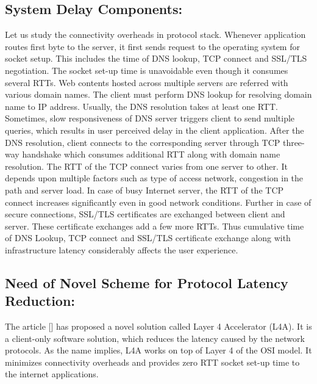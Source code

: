 \begin{multicols}{2}
\subsection{System Delay Components:}

Let us study the connectivity overheads in protocol stack. Whenever application routes first byte to the server, it first sends request to the operating system for socket setup. This includes the time of DNS lookup, TCP connect and SSL/TLS negotiation. The socket set-up time is unavoidable even though it consumes several RTTs. Web contents hosted across multiple servers are referred with various domain names. The client must perform DNS lookup for resolving domain name to IP address. Usually, the DNS resolution takes at least one RTT. Sometimes, slow responsiveness of DNS server triggers client to send multiple queries, which results in user perceived delay in the client application. After the DNS resolution, client connects to the corresponding server through TCP three-way handshake which consumes additional RTT along with domain name resolution. The RTT of the TCP connect varies from one server to other. It depends upon multiple factors such as type of access network, congestion in the path and server load. In case of busy Internet server, the RTT of the TCP connect increases significantly even in good network conditions. Further in case of secure connections, SSL/TLS certificates are exchanged between client and server. These certificate exchanges add a few more RTTs. Thus cumulative time of DNS Lookup, TCP connect and SSL/TLS certificate exchange along with infrastructure latency considerably affects the user experience.


\subsection{Need of Novel Scheme for Protocol Latency Reduction:}

The article [\cite{art1-key13}] has proposed a novel solution called Layer 4 Accelerator (L4A). It is a client-only software solution, which reduces the latency caused by the network protocols. As the name implies, L4A works on top of Layer 4 of the OSI model. It minimizes connectivity overheads and provides zero RTT socket set-up time to the internet applications.


\end{multicols}
